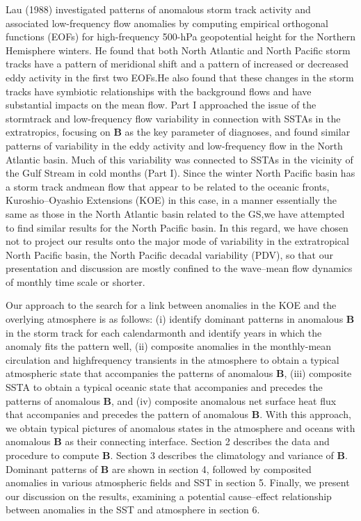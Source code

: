 \documentclass{ametsocv6.2}
\begin{document}
Lau (1988) investigated patterns of anomalous storm
track activity and associated low-frequency flow anomalies
by computing empirical orthogonal functions (EOFs)
for high-frequency 500-hPa geopotential height for the
Northern Hemisphere winters. He found that both North
Atlantic and North Pacific storm tracks have a pattern of
meridional shift and a pattern of increased or decreased
eddy activity in the first two EOFs.He also found that these
changes in the storm tracks have symbiotic relationships
with the background flows and have substantial impacts on
the mean flow. Part I approached the issue of the stormtrack
and low-frequency flow variability in connection with
SSTAs in the extratropics, focusing on $\mathbf{B}$ as the key parameter
of diagnoses, and found similar patterns of variability
in the eddy activity and low-frequency flow in the
North Atlantic basin. Much of this variability was connected
to SSTAs in the vicinity of the Gulf Stream in cold
months (Part I). Since the winter North Pacific basin has a
storm track andmean flow that appear to be related to the
oceanic fronts, Kuroshio--Oyashio Extensions (KOE) in
this case, in a manner essentially the same as those in the
North Atlantic basin related to the GS,we have attempted
to find similar results for the North Pacific basin. In this
regard, we have chosen not to project our results onto the
major mode of variability in the extratropical North Pacific
basin, the North Pacific decadal variability (PDV), so
that our presentation and discussion are mostly confined
to the wave--mean flow dynamics of monthly time scale or
shorter.


Our approach to the search for a link between anomalies
in the KOE and the overlying atmosphere is as follows:
(i) identify dominant patterns in anomalous $\mathbf{B}$ in the
storm track for each calendarmonth and identify years in
which the anomaly fits the pattern well, (ii) composite
anomalies in the monthly-mean circulation and highfrequency
transients in the atmosphere to obtain a typical
atmospheric state that accompanies the patterns of
anomalous $\mathbf B$, (iii) composite SSTA to obtain a typical
oceanic state that accompanies and precedes the patterns
of anomalous $\mathbf B$, and (iv) composite anomalous net surface
heat flux that accompanies and precedes the pattern of
anomalous $\mathbf B$. With this approach, we obtain typical pictures
of anomalous states in the atmosphere and oceans
with anomalous $\mathbf{B}$ as their connecting interface.
Section 2 describes the data and procedure to compute
$\mathbf B$. Section 3 describes the climatology and variance of $\mathbf B$.
Dominant patterns of $\mathbf B$ are shown in section 4, followed by
composited anomalies in various atmospheric fields and
SST in section 5. Finally, we present our discussion on the
results, examining a potential cause--effect relationship
between anomalies in the SST and atmosphere in section 6.
\end{document}
